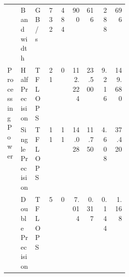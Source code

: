 \begin{tabular}{p{0.11\linewidth}p{0.12\linewidth}p{0.06\linewidth}rrrrrr}
    \cline{2-9}
                                                  & Bandwidth                & GB/s   & 732    & 484    & 900     & 616    & 288    & 696     \\
    \cline{1-9} \cline{2-9}
    \multirow[t]{3}{\linewidth}{Processing Power} & Half Precision           & TFLOPS & 21     & 0      & 112.224 & 23.500 & 9.216  & 149.680 \\
    \cline{2-9}
                                                  & Single Precision         & TFLOPS & 11     & 11     & 14.028  & 11.750 & 4.608  & 37.420  \\
    \cline{2-9}
                                                  & Double Precision         & TFLOPS & 5      & 0      & 7.014   & 0.317  & 0.144  & 1.168   \\
    \bottomrule
\end{tabular}
